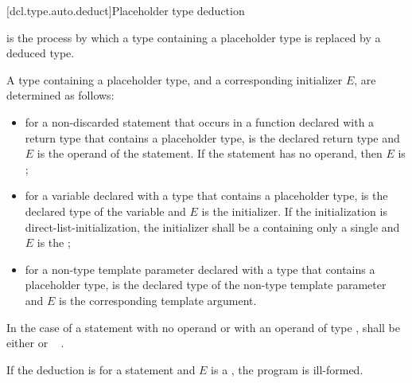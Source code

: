 [dcl.type.auto.deduct]{Placeholder type deduction}
%

\pnum
{}
is the process by which
a type containing a placeholder type
is replaced by a deduced type.

\pnum
A type  containing a placeholder type,
and a corresponding initializer $E$,
are determined as follows:
\begin{itemize}
\item
for a non-discarded  statement that occurs
in a function declared with a return type
that contains a placeholder type,
 is the declared return type
and $E$ is the operand of the  statement.
If the  statement
has no operand,
then $E$ is ;
\item
for a variable declared with a type
that contains a placeholder type,
 is the declared type of the variable
and $E$ is the initializer.
If the initialization is direct-list-initialization,
the initializer shall be a 
containing only a single 
and $E$ is the ;
\item
for a non-type template parameter declared with a type
that contains a placeholder type,
 is the declared type of the non-type template parameter
and $E$ is the corresponding template argument.
\end{itemize}

In the case of a  statement with no operand
or with an operand of type ,
 shall be either
  or
\cv{}~ .

\pnum
If the deduction is for a  statement
and $E$ is a ,
the program is ill-formed.

